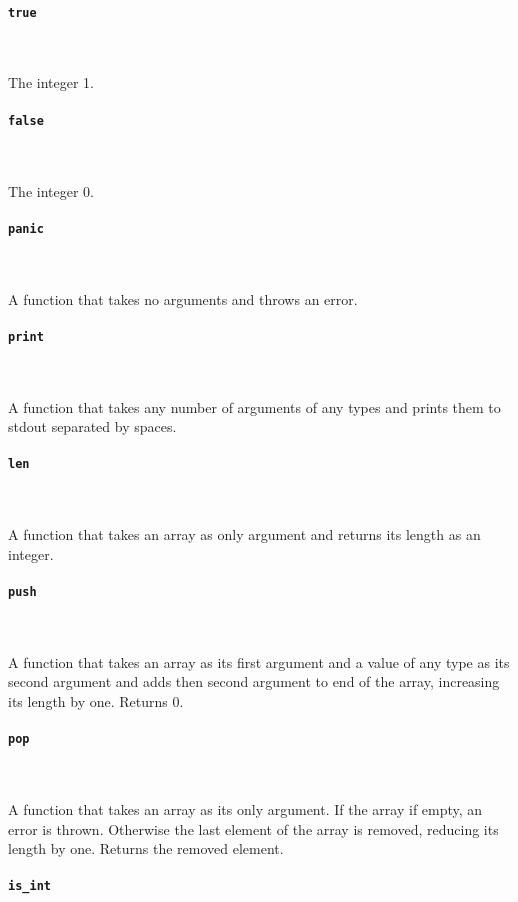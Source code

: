 \documentclass[12pt, a4paper]{article}
\begin{document}
\paragraph{\texttt{true}} \

The integer 1.

\paragraph{\texttt{false}} \

The integer 0.

\paragraph{\texttt{panic}} \

A function that takes no arguments and throws an error.

\paragraph{\texttt{print}} \

A function that takes any number of arguments of any types and prints them to stdout separated by spaces.

\paragraph{\texttt{len}} \

A function that takes an array as only argument and returns its length as an integer.

\paragraph{\texttt{push}} \

A function that takes an array as its first argument and a value of any type as its second argument and adds then second argument to end of the array, increasing its length by one. Returns 0.

\paragraph{\texttt{pop}} \

A function that takes an array as its only argument. If the array if empty, an error is thrown. Otherwise the last element of the array is removed, reducing its length by one. Returns the removed element.

\paragraph{\texttt{is\_int}} \
\end{document}
